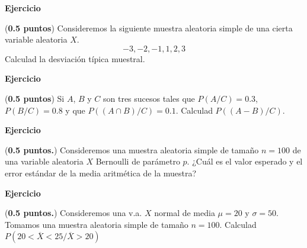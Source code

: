 \documentclass[12pt,spanish,es-nodecimaldot]{article}\usepackage[]{graphicx}\usepackage[]{color}
\makeatletter
\newcommand{\hlnum}[1]{\textcolor[rgb]{0.686,0.059,0.569}{#1}}%
\newcommand{\hlopt}[1]{\textcolor[rgb]{0,0,0}{#1}}%
\newcommand{\hlstd}[1]{\textcolor[rgb]{0.345,0.345,0.345}{#1}}%
\newcommand{\hlkwb}[1]{\textcolor[rgb]{0.69,0.353,0.396}{#1}}%
\newcommand{\hlkwd}[1]{\textcolor[rgb]{0.737,0.353,0.396}{\textbf{#1}}}%
\newenvironment{kframe}{%
 \def\at@end@of@kframe{}%
 \ifinner\ifhmode%
  \def\at@end@of@kframe{\end{minipage}}%
  \begin{minipage}{\columnwidth}%
 \fi\fi%
 \def\FrameCommand##1{\hskip\@totalleftmargin \hskip-\fboxsep
 \colorbox{shadecolor}{##1}\hskip-\fboxsep
     \hskip-\linewidth \hskip-\@totalleftmargin \hskip\columnwidth}%
 \MakeFramed {\advance\hsize-\width
   \@totalleftmargin\z@ \linewidth\hsize
   \@setminipage}}%
 {\par\unskip\endMakeFramed%
 \at@end@of@kframe}
\newenvironment{knitrout}{}{} %
\newcounter{problemes}
\newcounter{punts} \def\thepunts{\arabic{punts}}
\def\probl{\textbf{\newline\noindent\hspace{-1cm} Ejercicio}\addtocounter{problemes}{1} \setcounter{punts}{0}
\medskip\noindent{\bf \theproblemes) }}
\newif\ifsol
\makeatother
\begin{document}
\probl (\textbf{0.5 puntos})
Consideremos la siguiente muestra aleatoria simple de  una cierta variable aleatoria $X$.
$$-3,-2,-1,1,2,3$$
Calculad la desviación típica muestral.
\ifsol
\begin{knitrout}
\definecolor{shadecolor}{rgb}{0.969, 0.969, 0.969}\color{fgcolor}\begin{kframe}
\begin{alltt}
\hlstd{x}\hlkwb{=}\hlkwd{c}\hlstd{(}\hlopt{-}\hlnum{3}\hlstd{,}\hlopt{-}\hlnum{2}\hlstd{,}\hlopt{-}\hlnum{1}\hlstd{,}\hlnum{1}\hlstd{,}\hlnum{2}\hlstd{,}\hlnum{3}\hlstd{)}
\hlstd{n}\hlkwb{=}\hlkwd{length}\hlstd{(x)}
\hlstd{n}
\end{alltt}
\begin{verbatim}
## [1] 6
\end{verbatim}
\begin{alltt}
\hlkwd{sqrt}\hlstd{((}\hlkwd{sum}\hlstd{(x}\hlopt{^}\hlnum{2}\hlstd{)}\hlopt{/}\hlstd{n}\hlopt{-}\hlstd{(}\hlkwd{sum}\hlstd{(x)}\hlopt{/}\hlstd{n)}\hlopt{^}\hlnum{2}\hlstd{)} \hlopt{*}\hlstd{(n}\hlopt{/}\hlstd{(n}\hlopt{-}\hlnum{1}\hlstd{)))}
\end{alltt}
\begin{verbatim}
## [1] 2.366
\end{verbatim}
\begin{alltt}
\hlkwd{sd}\hlstd{(x)}
\end{alltt}
\begin{verbatim}
## [1] 2.366
\end{verbatim}
\end{kframe}
\end{knitrout}
\fi

\probl (\textbf{0.5 puntos})
Si $A$, $B$ y $C$ son tres sucesos tales que  $P(A/C)= 0.3$,  $P(B/C)=0.8$ y que $P((A\cap B)/C)=0.1$. Calculad $P((A-B)/C)$.
\ifsol

$P((A-B)/C)=$P(A/C)-$P(A\cap B/C)=0.3-0.1=0.2.$
\fi

\probl  (\textbf{0.5 puntos.})  Consideremos una muestra aleatoria simple  de tamaño $n=100$ de una variable aleatoria $X$ Bernoulli de parámetro $p$.
¿Cuál es el valor  esperado y el error estándar de la media aritmética de la muestra?
\ifsol
$E(\overline{X}) =E(X)= 100\cdot p$ $\sigma_{\overline{X}} =\sigma_{X}=\sqrt{\frac{p\cdot(1-p)}{100}}.$
\fi

\probl  (\textbf{0.5 puntos.})   Consideremos  una v.a. $X$ normal de media $\mu=20$ y $\sigma=50$. Tomamos una muestra aleatoria simple de tamaño $n=100$. Calculad
$P(20< \overline{X}<25 /\overline{X}>20)$
\end{document}
